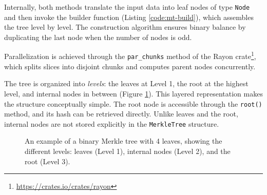 Internally, both methods translate the input data into leaf nodes of type \texttt{Node} and then invoke the builder function (Listing \ref{code:mt-build}), which assembles the tree level by level. The construction algorithm ensures binary balance by duplicating the last node when the number of nodes is odd.

Parallelization is achieved through the \texttt{par\_chunks} method of the Rayon crate\footnote{\url{https://crates.io/crates/rayon}}, which splits slices into disjoint chunks and computes parent nodes concurrently.

The tree is organized into \emph{levels}: the leaves at Level 1, the root at the highest level, and internal nodes in between (Figure \ref{fig:merkle-tree-levels}). This layered representation makes the structure conceptually simple. The root node is accessible through the \texttt{root()} method, and its hash can be retrieved directly. Unlike leaves and the root, internal nodes are not stored explicitly in the \texttt{MerkleTree} structure.

\begin{figure}[!ht]
\centering
{}
\caption{An example of a binary Merkle tree with 4 leaves, showing the different levels: leaves (Level 1), internal nodes (Level 2), and the root (Level 3).}
\label{fig:merkle-tree-levels}
\end{figure}

